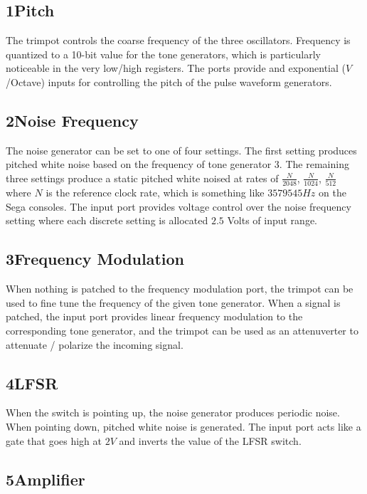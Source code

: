 \documentclass[12pt,letter]{article}
\begin{document}
\subsection*{1{\quad}Pitch}

The trimpot controls the coarse frequency of the three oscillators. Frequency
is quantized to a 10-bit value for the tone generators, which is particularly
noticeable in the very low/high registers. The ports provide and exponential
($V$/Octave) inputs for controlling the pitch of the pulse waveform
generators.

\subsection*{2{\quad}Noise Frequency}

The noise generator can be set to one of four settings. The first setting
produces pitched white noise based on the frequency of tone generator 3. The
remaining three settings produce a static pitched white noised at rates of
$\frac{N}{2048}$, $\frac{N}{1024}$, $\frac{N}{512}$ where $N$ is the reference
clock rate, which is something like $3579545Hz$ on the Sega consoles. The input
port provides voltage control over the noise frequency setting where each
discrete setting is allocated $2.5$ Volts of input range.

\subsection*{3{\quad}Frequency Modulation}

When nothing is patched to the frequency modulation port, the trimpot can be
used to fine tune the frequency of the given tone generator. When a signal is
patched, the input port provides linear frequency modulation to the
corresponding tone generator, and the trimpot can be used as an attenuverter
to attenuate / polarize the incoming signal.

\subsection*{4{\quad}LFSR}

When the switch is pointing up, the noise generator produces periodic noise.
When pointing down, pitched white noise is generated. The input port acts like
a gate that goes high at $2V$ and inverts the value of the LFSR switch.

\subsection*{5{\quad}Amplifier}
\end{document}

